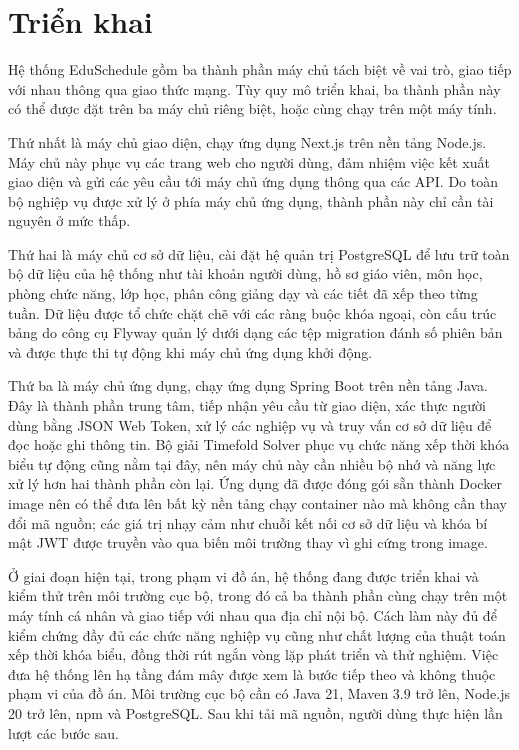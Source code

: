 \documentclass[../DoAn.tex]{subfiles}
\begin{document}
\section{Triển khai}
\label{section:4.5}

Hệ thống EduSchedule gồm ba thành phần máy chủ tách biệt về vai trò, giao tiếp
với nhau thông qua giao thức mạng. Tùy quy mô triển khai, ba thành phần này có
thể được đặt trên ba máy chủ riêng biệt, hoặc cùng chạy trên một máy tính.

Thứ nhất là máy chủ giao diện, chạy ứng dụng Next.js trên nền tảng Node.js. Máy
chủ này phục vụ các trang web cho người dùng, đảm nhiệm việc kết xuất giao diện
và gửi các yêu cầu tới máy chủ ứng dụng thông qua các API. Do toàn bộ nghiệp vụ
được xử lý ở phía máy chủ ứng dụng, thành phần này chỉ cần tài nguyên ở mức
thấp.

Thứ hai là máy chủ cơ sở dữ liệu, cài đặt hệ quản trị PostgreSQL để lưu trữ toàn
bộ dữ liệu của hệ thống như tài khoản người dùng, hồ sơ giáo viên, môn học,
phòng chức năng, lớp học, phân công giảng dạy và các tiết đã xếp theo từng tuần.
Dữ liệu được tổ chức chặt chẽ với các ràng buộc khóa ngoại, còn cấu trúc bảng do
công cụ Flyway quản lý dưới dạng các tệp migration đánh số phiên bản và được
thực thi tự động khi máy chủ ứng dụng khởi động.

Thứ ba là máy chủ ứng dụng, chạy ứng dụng Spring Boot trên nền tảng Java. Đây là
thành phần trung tâm, tiếp nhận yêu cầu từ giao diện, xác thực người dùng bằng
JSON Web Token, xử lý các nghiệp vụ và truy vấn cơ sở dữ liệu để đọc hoặc ghi
thông tin. Bộ giải Timefold Solver phục vụ chức năng xếp thời khóa biểu tự động
cũng nằm tại đây, nên máy chủ này cần nhiều bộ nhớ và năng lực xử lý hơn hai
thành phần còn lại. Ứng dụng đã được đóng gói sẵn thành Docker image nên có thể
đưa lên bất kỳ nền tảng chạy container nào mà không cần thay đổi mã nguồn; các
giá trị nhạy cảm như chuỗi kết nối cơ sở dữ liệu và khóa bí mật JWT được truyền
vào qua biến môi trường thay vì ghi cứng trong image.

Ở giai đoạn hiện tại, trong phạm vi đồ án, hệ thống đang được triển khai và kiểm
thử trên môi trường cục bộ, trong đó cả ba thành phần cùng chạy trên một máy
tính cá nhân và giao tiếp với nhau qua địa chỉ nội bộ. Cách làm này đủ để kiểm
chứng đầy đủ các chức năng nghiệp vụ cũng như chất lượng của thuật toán xếp thời
khóa biểu, đồng thời rút ngắn vòng lặp phát triển và thử nghiệm. Việc đưa hệ
thống lên hạ tầng đám mây được xem là bước tiếp theo và không thuộc phạm vi của
đồ án. Môi trường cục bộ cần có Java 21, Maven 3.9 trở lên, Node.js 20 trở lên,
npm và PostgreSQL. Sau khi tải mã nguồn, người dùng thực hiện lần lượt các bước
sau.
\end{document}
